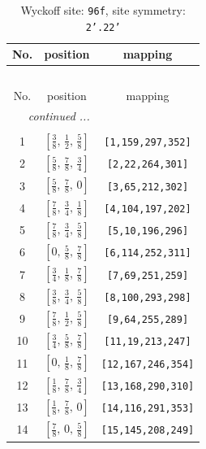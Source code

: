 \documentclass[fleqn,8pt]{jsarticle}
\begin{document}
\begin{longtable}{ccc}
\caption{Wyckoff site: {\tt 96f}, site symmetry: {\tt 2'.22'}}
 \\
 \hline \hline
No. & position & mapping \\ \hline \endfirsthead

\multicolumn{2}{l}{\tablename\ \thetable{}} \\
 \hline \hline
No. & position & mapping \\ \hline \endhead

 \hline \hline
\multicolumn{2}{r}{\footnotesize\it continued ...} \\ \endfoot

 \hline \hline
\multicolumn{2}{r}{} \\ \endlastfoot

1 & $\left[ \frac{3}{8},\, \frac{1}{2},\, \frac{5}{8} \right]$ & {\tt [1,159,297,352]} \\ \hline
2 & $\left[ \frac{5}{8},\, \frac{7}{8},\, \frac{3}{4} \right]$ & {\tt [2,22,264,301]} \\ \hline
3 & $\left[ \frac{5}{8},\, \frac{7}{8},\, 0 \right]$ & {\tt [3,65,212,302]} \\ \hline
4 & $\left[ \frac{7}{8},\, \frac{3}{4},\, \frac{1}{8} \right]$ & {\tt [4,104,197,202]} \\ \hline
5 & $\left[ \frac{7}{8},\, \frac{3}{4},\, \frac{5}{8} \right]$ & {\tt [5,10,196,296]} \\ \hline
6 & $\left[ 0,\, \frac{5}{8},\, \frac{7}{8} \right]$ & {\tt [6,114,252,311]} \\ \hline
7 & $\left[ \frac{3}{4},\, \frac{1}{8},\, \frac{7}{8} \right]$ & {\tt [7,69,251,259]} \\ \hline
8 & $\left[ \frac{3}{8},\, \frac{3}{4},\, \frac{5}{8} \right]$ & {\tt [8,100,293,298]} \\ \hline
9 & $\left[ \frac{7}{8},\, \frac{1}{2},\, \frac{5}{8} \right]$ & {\tt [9,64,255,289]} \\ \hline
10 & $\left[ \frac{3}{4},\, \frac{5}{8},\, \frac{7}{8} \right]$ & {\tt [11,19,213,247]} \\ \hline
11 & $\left[ 0,\, \frac{1}{8},\, \frac{7}{8} \right]$ & {\tt [12,167,246,354]} \\ \hline
12 & $\left[ \frac{1}{8},\, \frac{7}{8},\, \frac{3}{4} \right]$ & {\tt [13,168,290,310]} \\ \hline
13 & $\left[ \frac{1}{8},\, \frac{7}{8},\, 0 \right]$ & {\tt [14,116,291,353]} \\ \hline
14 & $\left[ \frac{7}{8},\, 0,\, \frac{5}{8} \right]$ & {\tt [15,145,208,249]} \\ \hline

\end{longtable}
\end{document}

